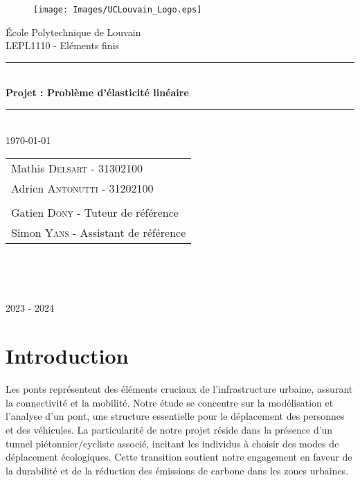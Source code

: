 \documentclass{article}
\newcommand{\HRule}{\rule{\linewidth}{0.5mm}}
\begin{document}
\begin{titlepage}
    \selectfont
    \color{UCLblue}
    \bfseries
    \begin{center}

    \begin{figure}
        \centering
        \texttt{[image: Images/UCLouvain\_Logo.eps]}
    \end{figure}

    {\LARGE École Polytechnique de Louvain}\\[1cm]

    {\Large LEPL1110 - Eléments finis}\\[1.5cm]
    \HRule \\[0.4cm]
    { \huge \bfseries Projet : Problème d'élasticité linéaire \\[0.2cm] }
    \HRule \\[1cm]
    \huge{\today}
    \vfill
    \large
      \begin{tabular}{l}
            
        Mathis \textsc{Delsart} - 31302100\\
        Adrien \textsc{Antonutti} - 31202100\\
        \\
        Gatien \textsc{Dony} - Tuteur de référence\\
        Simon \textsc{Yans} - Assistant de référence\\
        
      \end{tabular}
        ~\\
    \vfill
      \begin{center} \large
        \emph{}\\
        
        \hspace{40pt}
        \end{center}
    {\large 2023 - 2024}
  \end{center}
\end{titlepage}
\newpage

\newpage
\setlength{\parindent}{0cm}

\section{Introduction}

Les ponts représentent des éléments cruciaux de l'infrastructure urbaine, assurant la connectivité et la mobilité. Notre étude se concentre sur la modélisation et l'analyse d'un pont, une structure essentielle pour le déplacement des personnes et des véhicules. La particularité de notre projet réside dans la présence d'un tunnel piétonnier/cycliste associé, incitant les individus à choisir des modes de déplacement écologiques. Cette transition soutient notre engagement en faveur de la durabilité et de la réduction des émissions de carbone dans les zones urbaines.
\end{document}
